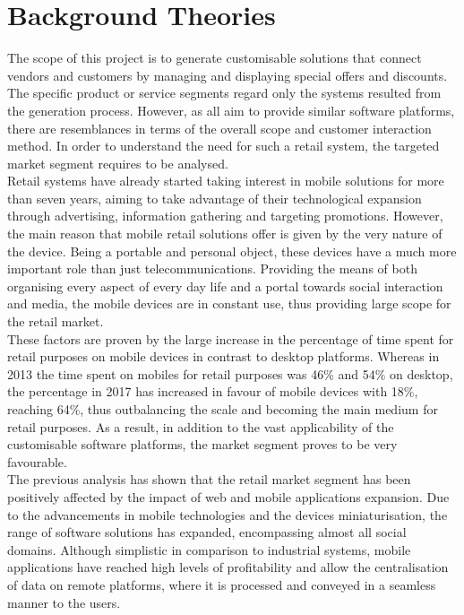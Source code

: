 \section{Background Theories}

The scope of this project is to generate customisable solutions that connect vendors and customers by managing and displaying special offers and discounts. The specific product or service segments regard only the systems resulted from the generation process. However, as all aim to provide similar software platforms, there are resemblances in terms of the overall scope and customer interaction method. In order to understand the need for such a retail system, the targeted market segment requires to be analysed.\\

Retail systems have already started taking interest in mobile solutions for more than seven years, aiming to take advantage of their technological expansion through advertising, information gathering and targeting promotions\cite{GREWAL2011S43}. However, the main reason that mobile retail solutions offer is given by the very nature of the device. Being a portable and personal object, these devices have a much more important role than just telecommunications. Providing the means of both organising every aspect of every day life and a portal towards social interaction and media, the mobile devices are in constant use, thus providing large scope for the retail market\cite{SHANKAR2010111}.\\

These factors are proven by the large increase in the percentage of time spent for retail purposes on mobile devices in contrast to desktop platforms. Whereas in 2013 the time spent on mobiles for retail purposes was 46\% and 54\% on desktop\cite{statistic_2017}, the percentage in 2017 has increased in favour of mobile devices with 18\%, reaching 64\%\cite{richter_2017}, thus outbalancing the scale and becoming the main medium for retail purposes. As a result, in addition to the vast applicability of the customisable software platforms, the market segment proves to be very favourable.\\

The previous analysis has shown that the retail market segment has been positively affected by the impact of web and mobile applications expansion. Due to the advancements in mobile technologies and the devices miniaturisation, the range of software solutions has expanded, encompassing almost all social domains. Although simplistic in comparison to industrial systems, mobile applications have reached high levels of profitability and allow the centralisation of data on remote platforms, where it is processed and conveyed in a seamless manner to the users.\\

